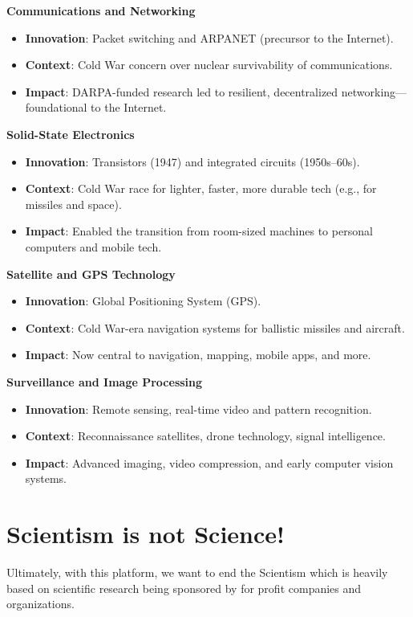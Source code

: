 \textbf{Communications and Networking}
\begin{itemize}
	\item \textbf{Innovation}: Packet switching and ARPANET (precursor to the Internet).
	\item \textbf{Context}: Cold War concern over nuclear survivability of communications.
	\item \textbf{Impact}: DARPA-funded research led to resilient, decentralized networking—foundational to the Internet. \cite{Leiner2009}
\end{itemize}

\textbf{Solid-State Electronics}
\begin{itemize}
	\item \textbf{Innovation}: Transistors (1947) and integrated circuits (1950s–60s).
	\item \textbf{Context}: Cold War race for lighter, faster, more durable tech (e.g., for missiles and space).
	\item \textbf{Impact}: Enabled the transition from room-sized machines to personal computers and mobile tech. \cite{RiordanHoddeson1997}
\end{itemize}

\textbf{Satellite and GPS Technology}
\begin{itemize}
	\item \textbf{Innovation}: Global Positioning System (GPS).
	\item \textbf{Context}: Cold War-era navigation systems for ballistic missiles and aircraft.
	\item \textbf{Impact}: Now central to navigation, mapping, mobile apps, and more. \cite{Pace1995}
\end{itemize}

\textbf{Surveillance and Image Processing}
\begin{itemize}
	\item \textbf{Innovation}: Remote sensing, real-time video and pattern recognition.
	\item \textbf{Context}: Reconnaissance satellites, drone technology, signal intelligence.
	\item \textbf{Impact}: Advanced imaging, video compression, and early computer vision systems. \cite{Krick1971}
\end{itemize}

\section{Scientism is not Science!}
Ultimately, with this platform, we want to end the Scientism which is heavily based on scientific research being sponsored by for profit companies and organizations.

